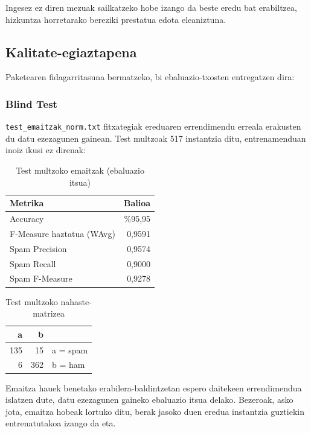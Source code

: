 \documentclass[12pt, a4paper]{article}
\begin{document}
Ingesez ez diren mezuak sailkatzeko hobe izango da beste eredu bat erabiltzea, hizkuntza horretarako bereziki prestatua edota eleaniztuna.

\subsection{Kalitate-egiaztapena}
Paketearen fidagarritasuna bermatzeko, bi ebaluazio-txosten entregatzen dira:

\subsubsection{Blind Test}

\texttt{test\_emaitzak\_norm.txt} fitxategiak ereduaren errendimendu erreala erakusten du datu ezezagunen gainean. Test multzoak 517 instantzia ditu, entrenamenduan inoiz ikusi ez direnak:

\begin{table}[H]
    \centering
    \caption{Test multzoko emaitzak (ebaluazio itsua)}
    \begin{tabular}{lr}
        \toprule
        \textbf{Metrika} & \textbf{Balioa} \\
        \midrule
        Accuracy                    & \%95,95 \\
        F-Measure haztatua (WAvg)   & 0,9591  \\
        \midrule
        Spam Precision              & 0,9574  \\
        Spam Recall                 & 0,9000  \\
        Spam F-Measure              & 0,9278  \\
        \bottomrule
    \end{tabular}
    \label{tab:test_blind}
\end{table}

\begin{table}[H]
    \centering
    \caption{Test multzoko nahaste-matrizea}
    \begin{tabular}{rr|l}
        \toprule
        \textbf{a} & \textbf{b} & \\
        \midrule
        135 & 15 & a = spam \\
        6  & 362 & b = ham \\
        \bottomrule
    \end{tabular}
    \label{tab:test_confusion_blind}
\end{table}

Emaitza hauek benetako erabilera-baldintzetan espero daitekeen errendimendua islatzen dute, datu ezezagunen gaineko ebaluazio itsua delako. Bezeroak, asko jota, emaitza hobeak lortuko ditu, berak jasoko duen eredua instantzia guztiekin entrenatutakoa izango da eta.
\end{document}
